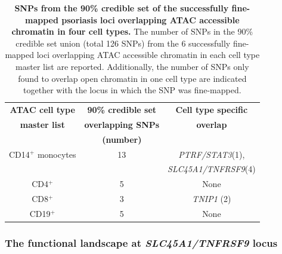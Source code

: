 \begin{table}[htbp]
\centering
\begin{tabular}{@{} c c c}
\toprule
\textbf{ATAC cell type} & \textbf{90\% credible set}   &  \textbf{Cell type specific}  \\
\textbf{master list}    & \textbf{overlapping SNPs}    &   \textbf{overlap}   \\
									      &	\textbf{(number)}				     &                            \\
\midrule
\midrule
 CD14$^+$ monocytes    & 13                            &  \textit{PTRF/STAT3}(1),\\ 
                       &                               &  \textit{SLC45A1/TNFRSF9}(4)\\
 CD4$^+$              & 5                             &  None \\
 CD8$^+$              & 3                             &  \textit{TNIP1} (2)        \\
 CD19$^+$              & 5                            &  None     \\
\bottomrule
\end{tabular}
\medskip %
\caption[SNPs from the 90\% credible set of the successfully fine-mapped psoriasis loci overlapping ATAC accessible chromatin in four cell types.]{\textbf{SNPs from the 90\% credible set of the successfully fine-mapped psoriasis loci overlapping ATAC accessible chromatin in four cell types.} The number of SNPs in the 90\% credible set union (total 126 SNPs) from the 6 successfully fine-mapped loci overlapping ATAC accessible chromatin in each cell type master list are reported. Additionally, the number of SNPs only found to overlap open chromatin in one cell type are indicated together with the locus in which the SNP was fine-mapped.}
\label{tab:Psoriasis_fine_mapping_ATAC_overlap}
\end{table}



\subsubsection{The functional landscape at \textit{SLC45A1/TNFRSF9} locus}

